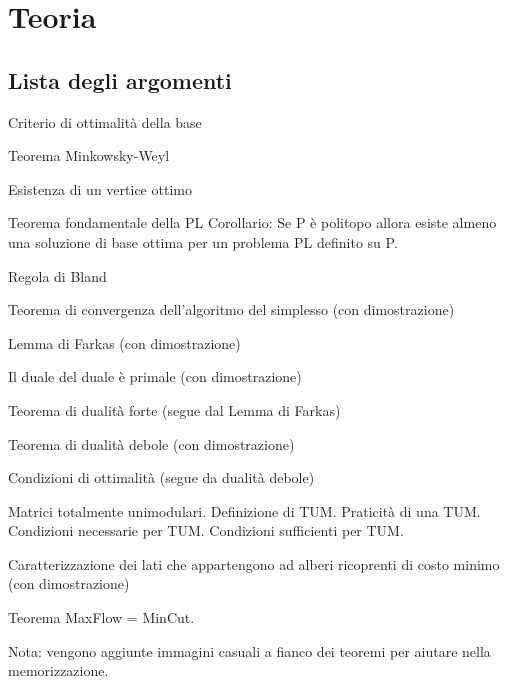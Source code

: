 \documentclass[\main/main.tex]{subfiles}
\begin{document}
\chapter{Teoria}

\section*{Lista degli argomenti}
\begin{todolist}
  \item Criterio di ottimalità della base
  \item Teorema Minkowsky-Weyl
  \item Esistenza di un vertice ottimo
  \item Teorema fondamentale della PL
  \subitem Corollario: Se P è politopo allora esiste almeno una soluzione di base ottima per un problema PL definito su P.
  \item Regola di Bland
  \item Teorema di convergenza dell'algoritmo del simplesso (con dimostrazione)
  \item Lemma di Farkas (con dimostrazione)
  \item Il duale del duale è primale (con dimostrazione)
  \item Teorema di dualità forte (segue dal Lemma di Farkas)
  \item Teorema di dualità debole (con dimostrazione)
  \item Condizioni di ottimalità (segue da dualità debole)
  \item Matrici totalmente unimodulari.
  \subitem Definizione di TUM.
  \subitem Praticità di una TUM.
  \subitem Condizioni necessarie per TUM.
  \subitem Condizioni sufficienti per TUM.
  \item Caratterizzazione dei lati che appartengono ad alberi ricoprenti di costo minimo (con dimostrazione)
  \item Teorema MaxFlow = MinCut.
\end{todolist}

Nota: vengono aggiunte immagini casuali a fianco dei teoremi per aiutare nella memorizzazione.

\clearpage





\clearpage


\clearpage





\clearpage

\clearpage


\end{document}
